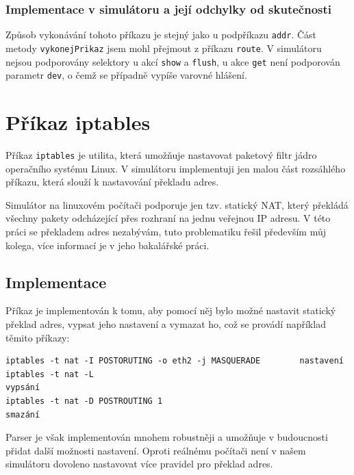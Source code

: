 \subsubsection{Implementace v simulátoru a její odchylky od skutečnosti}

Způsob vykonávání tohoto příkazu je stejný jako u podpříkazu \verb|addr|. Část metody \verb|vykonejPrikaz| jsem mohl přejmout z příkazu \verb|route|. V simulátoru nejsou podporovány selektory u akcí \verb|show| a \verb|flush|, u akce \verb|get| není podporován parametr \verb|dev|, o čemž se případně vypíše varovné hlášení.




\section{Příkaz iptables}

Příkaz \verb|iptables| je utilita, která umožňuje nastavovat paketový filtr jádro operačního systému Linux. V simulátoru implementuji jen malou část rozsáhlého příkazu, která slouží k nastavování překladu adres.

Simulátor na linuxovém počítači podporuje jen tzv. statický NAT, který překládá všechny pakety odcházející přes rozhraní na jednu veřejnou IP adresu. V této práci se překladem adres nezabývám, tuto problematiku řešil především můj kolega, více informací je v jeho bakalářské práci. 


\subsection{Implementace}

Příkaz je implementován k tomu, aby pomocí něj bylo možné nastavit statický překlad adres, vypsat jeho nastavení a vymazat ho, což se provádí například těmito příkazy:
\begin{verbatim}
iptables -t nat -I POSTORUTING -o eth2 -j MASQUERADE		nastavení
iptables -t nat -L													vypsání
iptables -t nat -D POSTROUTING 1									smazání

\end{verbatim}
Parser je však implementován mnohem robustněji a umožňuje v budoucnosti přidat další možnosti nastavení. Oproti reálnému počítači není v našem simulátoru dovoleno nastavovat více pravidel pro překlad adres.


